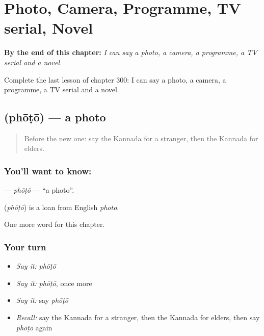 
\chapter{Photo, Camera, Programme, TV serial, Novel}
\label{ch:ka-photo-camera-programme-tv-serial-novel}

\begin{chapteropening}
\textbf{By the end of this chapter:} \emph{I can say a photo, a camera, a programme, a TV serial and a novel.}

Complete the last lesson of chapter 300: I can say a photo, a camera, a programme, a TV serial and a novel.
\end{chapteropening}

\section[\texorpdfstring{\kn{ಫೋಟೋ} (phōṭō)}{ಫೋಟೋ (phōṭō)}]{ (phōṭō) — a photo}

\label{lesson:KA-C300-photo}



\begin{quote}
Before the new one: say the Kannada for a stranger, then the Kannada for elders.
\end{quote}

\subsection*{You'll want to know: }
\textbf{} — \emph{phōṭō} — \textquotedblleft{}a photo\textquotedblright{}.

\begin{cousinweb}
\textbf{} (\emph{phōṭō}) is a loan from English \emph{photo}.
\end{cousinweb}

\begin{grammarlens}[title={What you've built}]
One more word for this chapter.
\end{grammarlens}

\subsection*{Your turn}
\begin{itemize}
\raggedright
  \item \emph{Say it:} \emph{phōṭō}
  \item \emph{Say it:} \emph{phōṭō}, once more
  \item \emph{Say it:} say \emph{phōṭō}
  \item \emph{Recall:} say the Kannada for a stranger, then the Kannada for elders, then say \emph{phōṭō} again
\end{itemize}

